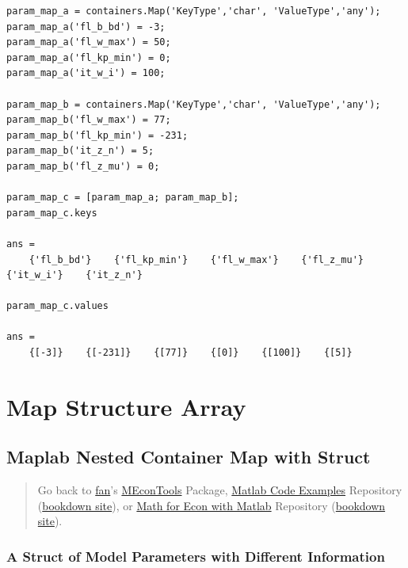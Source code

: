 \documentclass[
]{book}
\begin{document}
\begin{verbatim}
param_map_a = containers.Map('KeyType','char', 'ValueType','any');
param_map_a('fl_b_bd') = -3;
param_map_a('fl_w_max') = 50;
param_map_a('fl_kp_min') = 0;
param_map_a('it_w_i') = 100;

param_map_b = containers.Map('KeyType','char', 'ValueType','any');
param_map_b('fl_w_max') = 77;
param_map_b('fl_kp_min') = -231;
param_map_b('it_z_n') = 5;
param_map_b('fl_z_mu') = 0;

param_map_c = [param_map_a; param_map_b];
param_map_c.keys

ans = 
    {'fl_b_bd'}    {'fl_kp_min'}    {'fl_w_max'}    {'fl_z_mu'}    {'it_w_i'}    {'it_z_n'}

param_map_c.values

ans = 
    {[-3]}    {[-231]}    {[77]}    {[0]}    {[100]}    {[5]}
\end{verbatim}

\hypertarget{map-structure-array}{%
\section{Map Structure Array}\label{map-structure-array}}

\hypertarget{maplab-nested-container-map-with-struct}{%
\subsection{Maplab Nested Container Map with Struct}\label{maplab-nested-container-map-with-struct}}

\begin{quote}
Go back to \href{http://fanwangecon.github.io/}{fan}'s \href{https://fanwangecon.github.io/MEconTools/}{MEconTools} Package, \href{https://fanwangecon.github.io/M4Econ/}{Matlab Code Examples} Repository (\href{https://fanwangecon.github.io/M4Econ/bookdown}{bookdown site}), or \href{https://fanwangecon.github.io/Math4Econ/}{Math for Econ with Matlab} Repository (\href{https://fanwangecon.github.io/Math4Econ/bookdown}{bookdown site}).
\end{quote}

\hypertarget{a-struct-of-model-parameters-with-different-information}{%
\subsubsection{A Struct of Model Parameters with Different Information}\label{a-struct-of-model-parameters-with-different-information}}
\end{document}
